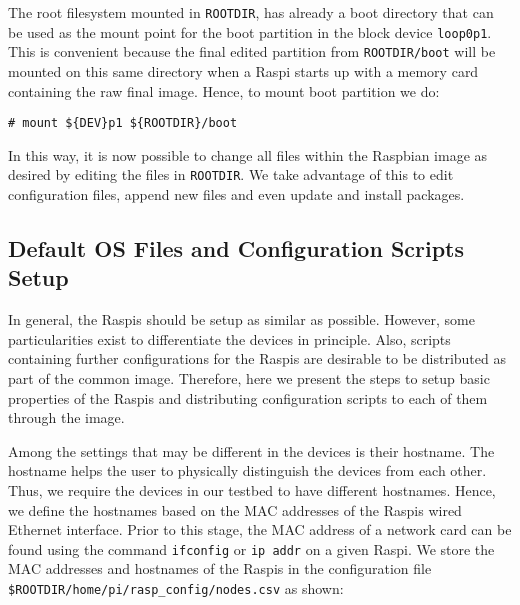 The root filesystem mounted in \texttt{ROOTDIR}, has already a boot
directory that can be used as the mount point for the boot partition
in the block device \texttt{loop0p1}. This is convenient because
the final edited partition from \texttt{ROOTDIR/boot} will be mounted on
this same directory when a \ac{Raspi} starts up with a memory card
containing the raw final image. Hence, to mount boot partition we do:

\begin{lstlisting}[]
# mount ${DEV}p1 ${ROOTDIR}/boot
\end{lstlisting}
\FloatBarrier
\vspace{-5mm}

In this way, it is now possible to change all files within the Raspbian
image as desired by editing the files in \texttt{ROOTDIR}. We take
advantage of this to edit configuration files, append new files and even
update and install packages.

\subsection{Default OS Files and Configuration Scripts Setup}

In general, the \ac{Raspi}s should be setup as similar as possible. However,
some particularities exist to differentiate the devices in principle. Also,
scripts containing further configurations for the \ac{Raspi}s are desirable
to be distributed as part of the common image. Therefore, here we present
the steps to setup basic properties of the \ac{Raspi}s and distributing
configuration scripts to each of them through the image.

Among the settings that may be different in the devices is their hostname.
The hostname helps the user to physically distinguish the devices from
each other. Thus, we require the devices in our testbed to have different
hostnames. Hence, we define the hostnames based on the \ac{MAC} addresses
of the \ac{Raspi}s wired Ethernet interface. Prior to this stage, the
\ac{MAC} address of a network card can be found using the command
\texttt{ifconfig} or \texttt{ip addr} on a given \ac{Raspi}.
We store the \ac{MAC} addresses and hostnames of the \ac{Raspi}s in the
configuration file \texttt{\${ROOTDIR}/home/pi/rasp\_config/nodes.csv} as
shown:

